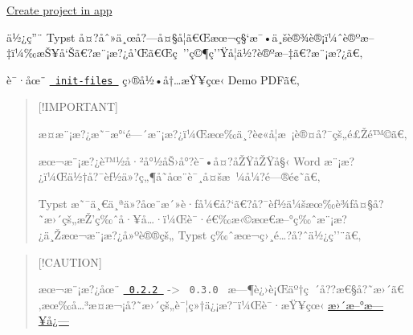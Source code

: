 \href{/app?template=cheda-seu-thesis&version=0.3.0}{Create project in
app}

\label{readme}
ä½¿ç''¨ Typst
å¤?åˆ»ä¸œå?---å¤§å­¦ã€Œæœ¬ç§`æ¯•ä¸šè®¾è®¡ï¼ˆè®ºæ--‡ï¼‰æŠ¥å`Šã€?æ¨¡æ?¿å'Œã€Œç~''ç©¶ç''Ÿå­¦ä½?è®ºæ--‡ã€?æ¨¡æ?¿ã€‚

è¯·åœ¨
\href{https://github.com/typst/packages/raw/main/packages/preview/cheda-seu-thesis/0.3.0/init-files/}{\texttt{\ init-files\ }}
ç›®å½•å†\ldots æŸ¥çœ‹ Demo PDFã€‚

\begin{quote}
{[}!IMPORTANT{]}

æ­¤æ¨¡æ?¿æ˜¯æ°`é---´æ¨¡æ?¿ï¼Œæœ‰ä¸?è¢«å­¦æ~¡è®¤å?¯çš„é£Žé™©ã€‚

æœ¬æ¨¡æ?¿è™½å·²å°½åŠ›å°?è¯•å¤?åŽŸåŽŸå§‹ Word
æ¨¡æ?¿ï¼Œä½†å?¯èƒ½ä»?ç„¶å­˜åœ¨è¯¸å¤šæ~¼å¼?é---®é¢˜ã€‚

Typst
æ˜¯ä¸€ä¸ªä»?åœ¨æ´»è·ƒå¼€å?{}`ã€?å?¯èƒ½ä¼šæœ‰è¾ƒå¤§å?˜æ›´çš„æŽ'ç‰ˆå·¥å\ldots·ï¼Œè¯·é€‰æ‹©æœ€æ--°ç‰ˆæ¨¡æ?¿ä¸Žæœ¬æ¨¡æ?¿å»ºè®®çš„
Typst ç‰ˆæœ¬ç›¸é\ldots?å?ˆä½¿ç''¨ã€‚
\end{quote}

\begin{quote}
{[}!CAUTION{]}

æœ¬æ¨¡æ?¿åœ¨
\href{https://github.com/csimide/SEU-Typst-Template/tree/c44b5172178c0c2380b322e50931750e2d761168}{\texttt{\ 0.2.2\ }}
-\textgreater{} \texttt{\ 0.3.0\ }
æ---¶è¿›è¡Œäº†ç~´å??æ€§å?˜æ›´ã€‚æœ‰å\ldots³æ­¤æ¬¡å?˜æ›´çš„è¯¦ç»†ä¿¡æ?¯ï¼Œè¯·æŸ¥çœ‹
\href{https://github.com/typst/packages/raw/main/packages/preview/cheda-seu-thesis/0.3.0/CHANGELOG.md}{æ›´æ--°æ---¥å¿---}
\end{quote}

